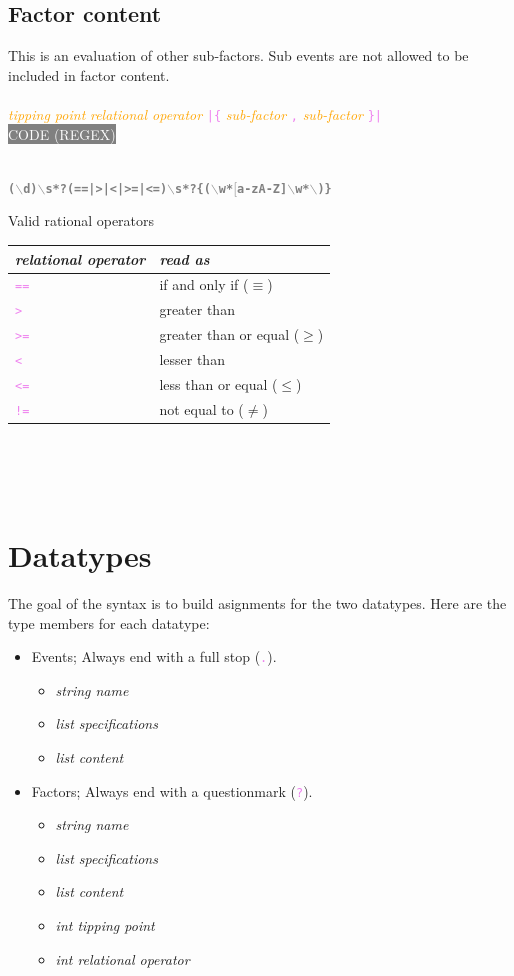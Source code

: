 \documentclass[15pt,a4paper,oneside]{article}
\newcommand{\regex}[1]{{\tiny\\\colorbox{grey}{\textcolor{white}{CODE (REGEX)}\hspace{0.87\textwidth}}}\vspace{-2.2em}\\\begin{framed}\bf{\textcolor{grey}{\vspace{-1.5em}\\\texttt{\small #1}}}\vspace{-0.33em}\end{framed}\vspace{-0.75em}}
\newcommand{\code}[1]{{\textcolor{violet}{\texttt{\small #1}}}}
\newcommand{\comment}[1]{{\textcolor{orange}{\it #1}}}
\begin{document}
\subsection{Factor content}
This is an evaluation of other sub-factors. Sub events are not allowed to be included in factor content.\\\\
\code{} \comment{tipping point} \hspace{2em} \comment{relational operator} \code{|\{} \comment{sub-factor} \code{,} \comment{sub-factor} \code{\}|}
\regex{($\backslash$d)$\backslash$s*?(==|>|<|>=|<=)$\backslash$s*?\{($\backslash$w*$[$a-zA-Z]$\backslash$w*$\backslash$)\}}
Valid rational operators

\begin{tabular}{l|l}
{\it relational operator} & {\it read as}\\
\hline{\textcolor{violet}{\tt ==}} & if and only if ($\equiv$)\\
{\textcolor{violet}{\tt >}} & greater than \\
{\textcolor{violet}{\tt >=}} & greater than or equal ($\geq$)\\
{\textcolor{violet}{\tt <}} & lesser than\\
{\textcolor{violet}{\tt <=}} & less than or equal ($\leq$)\\
{\textcolor{violet}{\tt !=}} & not equal to ($\neq$)\\
\end{tabular}\\\\\\
\section{Datatypes}
The goal of the syntax is to build asignments for the two datatypes. Here are the type members for each datatype:\\

\begin{itemize}
\item Events; Always end with a full stop (\code{.}).
\begin{itemize}
\item {\it string name}
\item {\it list specifications}
\item {\it list content}
\end{itemize}
\item Factors; Always end with a questionmark (\code{?}).
\begin{itemize}
\item {\it string name}
\item {\it list specifications}
\item {\it list content}
\item {\it int tipping point}
\item {\it int relational operator}
\end{itemize}
\end{itemize}
\end{document}
